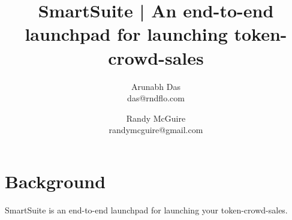 \documentclass{article}
\author{Arunabh Das \\ {das@rndflo.com}
   \and Randy McGuire \\ {randymcguire@gmail.com}}
\title{SmartSuite | An end-to-end launchpad for launching token-crowd-sales}
\date{\vspace{-5ex}}
\begin{document}
\maketitle

\section{Background}
SmartSuite is an end-to-end launchpad for launching your token-crowd-sales.
\end{document}
